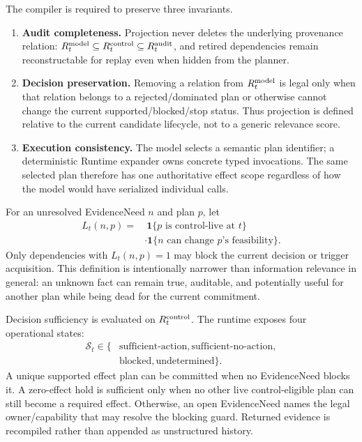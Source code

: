 \documentclass[journal,10pt]{IEEEtran}
\begin{document}
The compiler is required to preserve three invariants.
\begin{enumerate}
\item \textbf{Audit completeness.} Projection never deletes the underlying provenance relation:
$R_t^{\rm model}\subseteq R_t^{\rm control}\subseteq R_t^{\rm audit}$, and retired dependencies
remain reconstructable for replay even when hidden from the planner.
\item \textbf{Decision preservation.} Removing a relation from $R_t^{\rm model}$ is legal only
when that relation belongs to a rejected/dominated plan or otherwise cannot change the current
supported/blocked/stop status. Thus projection is defined relative to the current candidate
lifecycle, not to a generic relevance score.
\item \textbf{Execution consistency.} The model selects a semantic plan identifier; a deterministic
Runtime expander owns concrete typed invocations. The same selected plan therefore has one
authoritative effect scope regardless of how the model would have serialized individual calls.
\end{enumerate}

For an unresolved EvidenceNeed $n$ and plan $p$, let
\begin{equation}
\begin{aligned}
L_t(n,p)=&\ \mathbf 1\{p\text{ is control-live at }t\}\\
&\cdot\mathbf 1\{n\text{ can change }p\text{'s feasibility}\}.
\end{aligned}
\label{eq:dependency-live}
\end{equation}
Only dependencies with $L_t(n,p)=1$ may block the current decision or trigger acquisition. This
definition is intentionally narrower than information relevance in general: an unknown fact can
remain true, auditable, and potentially useful for another plan while being dead for the current
commitment.

Decision sufficiency is evaluated on $R_t^{\rm control}$. The runtime exposes four operational
states:
\begin{equation}
\begin{aligned}
\mathcal S_t\in\{&\text{sufficient-action},\text{sufficient-no-action},\\
&\text{blocked},\text{undetermined}\}.
\end{aligned}
\end{equation}
A unique supported effect plan can be committed when no EvidenceNeed blocks it. A zero-effect
hold is sufficient only when no other live control-eligible plan can still become a required
effect. Otherwise, an open EvidenceNeed names the legal owner/capability that may resolve the
blocking guard. Returned evidence is recompiled rather than appended as unstructured history.
\end{document}
